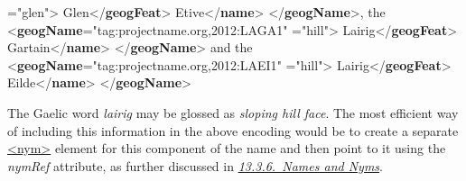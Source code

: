 \begin{shaded}
{\hspace*{1em}{type}="{glen}">}\mbox{}\newline 
{}Glen{</\textbf{geogFeat}>}\mbox{}\newline 
{}Etive{</\textbf{name}>}\mbox{}\newline 
{</\textbf{geogName}>}, the {<\textbf{geogName}\hspace*{1em}{ref}="{tag:projectname.org,2012:LAGA1}"\mbox{}\newline 
\hspace*{1em}{type}="{hill}">}\mbox{}\newline 
{}Lairig{</\textbf{geogFeat}>}\mbox{}\newline 
{}Gartain{</\textbf{name}>}\mbox{}\newline 
{</\textbf{geogName}>} and the \mbox{}\newline 
{<\textbf{geogName}\hspace*{1em}{ref}="{tag:projectname.org,2012:LAEI1}"\mbox{}\newline 
\hspace*{1em}{type}="{hill}">}\mbox{}\newline 
{}Lairig{</\textbf{geogFeat}>}\mbox{}\newline 
{}Eilde{</\textbf{name}>}\mbox{}\newline 
{</\textbf{geogName}>}\end{shaded}\egroup\par \par
The Gaelic word \textit{lairig} may be glossed as  \textit{sloping hill face}. The most efficient way of including this information in the above encoding would be to create a separate \hyperref[TEI.nym]{<nym>} element for this component of the name and then point to it using the {\itshape nymRef} attribute, as further discussed in \textit{\hyperref[NDNYM]{13.3.6.\ Names and Nyms}}.

